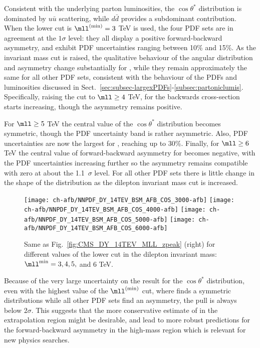  Consistent with the underlying parton luminosities, the $\cos\theta^*$ distribution
 is dominated by $u\bar{u}$ scattering, while  $d\bar{d}$ provides
 a subdominant contribution.
 When the lower cut  is $\mll^{(\rm min)}=3$ TeV is used, the four PDF
 sets are in agreement at the $1\sigma$ level: they all
 display a 
 positive forward-backward asymmetry, and exhibit PDF uncertainties ranging between 10\% and 15\%.
 As the invariant mass cut is raised, the qualitative behaviour of the
 angular distribution and
 asymmetry change substantially for , while they remain
 approximately the same for all other PDF sets, consistent with the
 behaviour of the PDFs and luminosities discussed in
 Sect.~\ref{sec:subsec-largexPDFs}-\ref{subsec:partoniclumis}.
%
 Specifically,
 raising the cut to
 $\mll \ge 4$ TeV, for 
 the backwards cross-section starts increasing, though the asymmetry remains
positive.

For $\mll\ge 5$ TeV the central value of the  $\cos\theta^*$
 distribution  becomes symmetric, though the  PDF uncertainty band is
 rather asymmetric. Also, PDF uncertainties
 are now the largest for , reaching up to 30\%.
 Finally, for $\mll\ge 6$ TeV  the central value of 
 forward-backward asymmetry for  becomes negative, with the
 PDF uncertainties increasing further so the asymmetry remains compatible
 with zero at about the 1.1~$\sigma$ level.
 For all other PDF sets there is little change in the shape of the distribution as the
 dilepton invariant mass cut is increased.

\begin{figure}[t!]
 \centering
 \texttt{[image: ch-afb/NNPDF\_DY\_14TEV\_BSM\_AFB\_COS\_3000-afb]}
 \texttt{[image: ch-afb/NNPDF\_DY\_14TEV\_BSM\_AFB\_COS\_4000-afb]}
 \texttt{[image: ch-afb/NNPDF\_DY\_14TEV\_BSM\_AFB\_COS\_5000-afb]}
 \texttt{[image: ch-afb/NNPDF\_DY\_14TEV\_BSM\_AFB\_COS\_6000-afb]}
 \caption{Same as Fig.~\ref{fig:CMS_DY_14TEV_MLL_zpeak} (right)
   for different values of the  lower cut in the dilepton
   invariant mass: $\mll^{\rm min}=3, 4,5,$ and 6 TeV.
  }    
 \label{fig:CMS_DY_14TEV_MLL_others_asy}
\end{figure}

Because of the very large uncertainty on the  result for the $\cos\theta^*$
distribution, even with
the highest value of the  $\mll^{(\rm  min)}$ cut, where  finds a
symmetric distributions while all other PDF sets find an asymmetry,
the pull is always below $2 \sigma$.
%
This suggests that the more
conservative estimate of   in the extrapolation region might be
desirable, and lead to more robust predictions for the
forward-backward asymmetry in the high-mass region which is relevant
for new physics searches.

